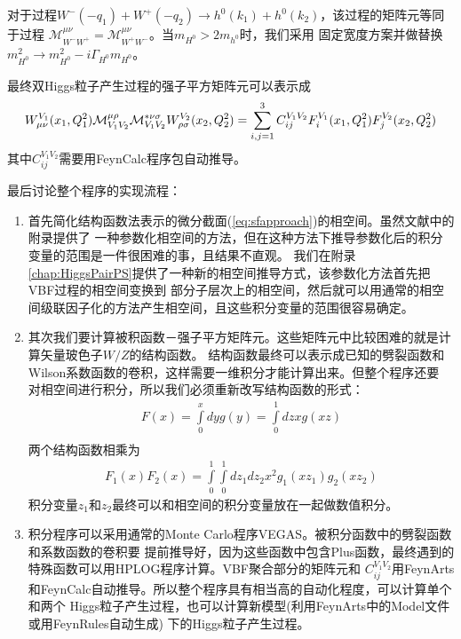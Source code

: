 对于过程$W^-(-q_1) + W^+(-q_2) \rightarrow h^0(k_1) + h^0(k_2)$，该过程的矩阵元等同于过程
${\mathcal M}^{\mu\nu}_{W^-W^+} = {\mathcal M}^{\mu\nu}_{W^+W^-}$。当$m_{H^0} > 2 m_{h^0}$时，我们采用
固定宽度方案并做替换$m^2_{H^0}\to m^2_{H^0} - i\Gamma_{H^0} m_{H^0}$。

最终双Higgs粒子产生过程的强子平方矩阵元可以表示成
\begin{eqnarray}
W_{\mu \nu}^{V_1}(x_1, Q^2_1) {\cal M}^{\mu
\rho}_{V_1 V_2} {\cal M}^{\ast \nu \sigma}_{V_1 V_2} W_{\rho
\sigma}^{V_2}(x_2, Q^2_2) = \sum_{i,j=1}^3 C_{ij}^{V_1 V_2}
F_i^{V_1}(x_1, Q^2_1) F_j^{V_2}(x_2, Q^2_2) \nonumber \\
\label{eq:squaredht} 
\end{eqnarray}
其中$C_{ij}^{V_1 V_2}$需要用FeynCalc\cite{feyncalc}程序包自动推导。

最后讨论整个程序的实现流程：
\begin{enumerate}
\item 首先简化结构函数法表示的微分截面(\ref{eq:sfapproach})的相空间。虽然文献\cite{big-vbf}中的附录提供了
一种参数化相空间的方法，但在这种方法下推导参数化后的积分变量的范围是一件很困难的事，且结果不直观。
我们在附录\ref{chap:HiggsPairPS}提供了一种新的相空间推导方式，该参数化方法首先把VBF过程的相空间变换到
部分子层次上的相空间，然后就可以用通常的相空间级联因子化的方法产生相空间，且这些积分变量的范围很容易确定。
\item 其次我们要计算被积函数－强子平方矩阵元。这些矩阵元中比较困难的就是计算矢量玻色子$W/Z$的结构函数。
结构函数最终可以表示成已知的劈裂函数和Wilson系数函数的卷积，这样需要一维积分才能计算出来。但整个程序还要
对相空间进行积分，所以我们必须重新改写结构函数的形式：
\begin{eqnarray}
F(x) = \int\limits^{x}_{0} dy g(y) = \int\limits^1_0 dz x g(xz) \nonumber \\
\end{eqnarray}
两个结构函数相乘为
\begin{eqnarray}
F_1(x)F_2(x) = \int\limits^1_0 \int\limits^1_0 dz_1 dz_2 x^2 g_1(xz_1) g_2(xz_2)
\end{eqnarray}
积分变量$z_1$和$z_2$最终可以和相空间的积分变量放在一起做数值积分。
\item 积分程序可以采用通常的Monte Carlo程序VEGAS\cite{vegas}。被积分函数中的劈裂函数和系数函数的卷积要
提前推导好，因为这些函数中包含Plus函数，最终遇到的特殊函数可以用HPLOG程序计算。VBF聚合部分的矩阵元和
$C_{ij}^{V_1 V_2}$用FeynArts和FeynCalc自动推导。所以整个程序具有相当高的自动化程度，可以计算单个和两个
Higgs粒子产生过程，也可以计算新模型(利用FeynArts中的Model文件或用FeynRules\cite{feynrules}自动生成)
下的Higgs粒子产生过程。
\end{enumerate}

